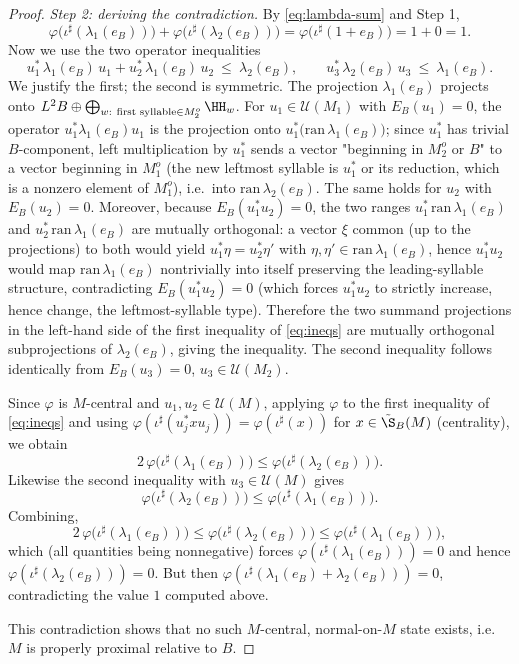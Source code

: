 \begin{proof}
\medskip
\emph{Step 2: deriving the contradiction.}
By \eqref{eq:lambda-sum} and Step 1,
\[
\varphi\big(\iota^\sharp(\lambda_1(e_B))\big)+\varphi\big(\iota^\sharp(\lambda_2(e_B))\big)
=\varphi\big(\iota^\sharp(1+e_B)\big)=1+0=1 .
\]
Now we use the two operator inequalities
\begin{equation}\label{eq:ineqs}
u_1^*\,\lambda_1(e_B)\,u_1+u_2^*\,\lambda_1(e_B)\,u_2\ \le\ \lambda_2(e_B),
\qquad
u_3^*\,\lambda_2(e_B)\,u_3\ \le\ \lambda_1(e_B).
\end{equation}
We justify the first; the second is symmetric. The projection $\lambda_1(e_B)$ projects onto
$L^2B\oplus\bigoplus_{w:\ \text{first syllable}\in M_2^o}\HH_w$. For $u_1\in\mathcal U(M_1)$
with $E_B(u_1)=0$, the operator $u_1^*\lambda_1(e_B)u_1$ is the projection onto
$u_1^*\big(\mathrm{ran}\,\lambda_1(e_B)\big)$; since $u_1^*$ has trivial $B$-component, left
multiplication by $u_1^*$ sends a vector "beginning in $M_2^o$ or $B$" to a vector beginning
in $M_1^o$ (the new leftmost syllable is $u_1^*$ or its reduction, which is a nonzero element
of $M_1^o$), i.e.\ into $\mathrm{ran}\,\lambda_2(e_B)$. The same holds for $u_2$ with
$E_B(u_2)=0$. Moreover, because $E_B(u_1^*u_2)=0$, the two ranges
$u_1^*\,\mathrm{ran}\,\lambda_1(e_B)$ and $u_2^*\,\mathrm{ran}\,\lambda_1(e_B)$ are mutually
orthogonal: a vector $\xi$ common (up to the projections) to both would yield
$u_1^*\eta=u_2^*\eta'$ with $\eta,\eta'\in\mathrm{ran}\,\lambda_1(e_B)$, hence
$u_1^*u_2$ would map $\mathrm{ran}\,\lambda_1(e_B)$ nontrivially into itself preserving the
leading-syllable structure, contradicting $E_B(u_1^*u_2)=0$ (which forces $u_1^*u_2$ to
strictly increase, hence change, the leftmost-syllable type). Therefore the two summand
projections in the left-hand side of the first inequality of \eqref{eq:ineqs} are mutually
orthogonal subprojections of $\lambda_2(e_B)$, giving the inequality. The second inequality
follows identically from $E_B(u_3)=0$, $u_3\in\mathcal U(M_2)$.

Since $\varphi$ is $M$-central and $u_1,u_2\in\mathcal U(M)$, applying $\varphi$ to the first
inequality of \eqref{eq:ineqs} and using $\varphi(\iota^\sharp(u_j^* x u_j))
=\varphi(\iota^\sharp(x))$ for $x\in\tilde\S_B(M)$ (centrality), we obtain
\[
2\,\varphi\big(\iota^\sharp(\lambda_1(e_B))\big)
\le\varphi\big(\iota^\sharp(\lambda_2(e_B))\big).
\]
Likewise the second inequality with $u_3\in\mathcal U(M)$ gives
\[
\varphi\big(\iota^\sharp(\lambda_2(e_B))\big)
\le\varphi\big(\iota^\sharp(\lambda_1(e_B))\big).
\]
Combining,
\[
2\,\varphi\big(\iota^\sharp(\lambda_1(e_B))\big)
\le\varphi\big(\iota^\sharp(\lambda_2(e_B))\big)
\le\varphi\big(\iota^\sharp(\lambda_1(e_B))\big),
\]
which (all quantities being nonnegative) forces
$\varphi(\iota^\sharp(\lambda_1(e_B)))=0$ and hence
$\varphi(\iota^\sharp(\lambda_2(e_B)))=0$. But then
$\varphi(\iota^\sharp(\lambda_1(e_B)+\lambda_2(e_B)))=0$, contradicting the value $1$
computed above.

This contradiction shows that no such $M$-central, normal-on-$M$ state exists, i.e.\ $M$ is
properly proximal relative to $B$.
\end{proof}

